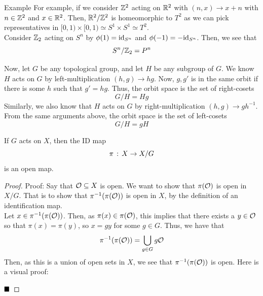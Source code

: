 \begin{example}{Example}
    For example, if we consider $\Z^2$ acting on $\R^2$ with $(n, x) \to x + n$ with $n \in \Z^2$ and $x \in \R^2$. Then, $\R^2 / \Z^2$ is homeomorphic to $T^2$ as we can pick representatives in $[0, 1) \times [0, 1) \simeq S^1 \times S^1 \simeq T^2$.\\

    Consider $\Z_{2}$ acting on $S^{n}$ by $\phi(1) = \id_{S^{n}}$ and $\phi(-1) = -\id_{S^{n}}$. Then, we see that
    \[ S^{n} / \Z_{2} = P^{n} \]

    Now, let $G$ be any topological group, and let $H$ be any subgroup of $G$. We know $H$ acts on $G$ by left-multiplication $(h, g) \to hg$. Now, $g, g'$ is in the same orbit if there is some $h$ such that $g' = hg$. Thus, the orbit space is the set of right-cosets
    \[ G/H = Hg \]
    Similarly, we also know that $H$ acts on $G$ by right-multiplication $(h, g) \to gh^{-1}$. From the same arguments above, the orbit space is the set of left-cosets
    \[ G/H = gH \]
\end{example}

\begin{lemma}
    If $G$ acts on $X$, then the ID map
    \[ \pi \col X \to X/G \]
    is an open map. 
\end{lemma}
\begin{proof}{Proof:}
    Say that $\cal{O} \subseteq X$ is open. We want to show that $\pi(\cal{O})$ is open in $X / G$. That is to show that $\pi^{-1}(\pi(\cal{O}))$ is open in $X$, by the definition of an identification map.\\

    Let $x \in \pi^{-1}(\pi(\cal{O}))$. Then, as $\pi(x) \in \pi(\cal{O})$, this implies that there exists a $y \in \cal{O}$ so that $\pi(x) = \pi(y)$, so $x = gy$ for some $g \in G$. Thus, we have that
    \[ \pi^{-1}(\pi(\cal{O})) = \bigcup_{g \in G} g\cal{O} \]
    Then, as this is a union of open sets in $X$, we see that $\pi^{-1}(\pi(\cal{O}))$ is open. Here is a visual proof:

    $\qed$
\end{proof}

